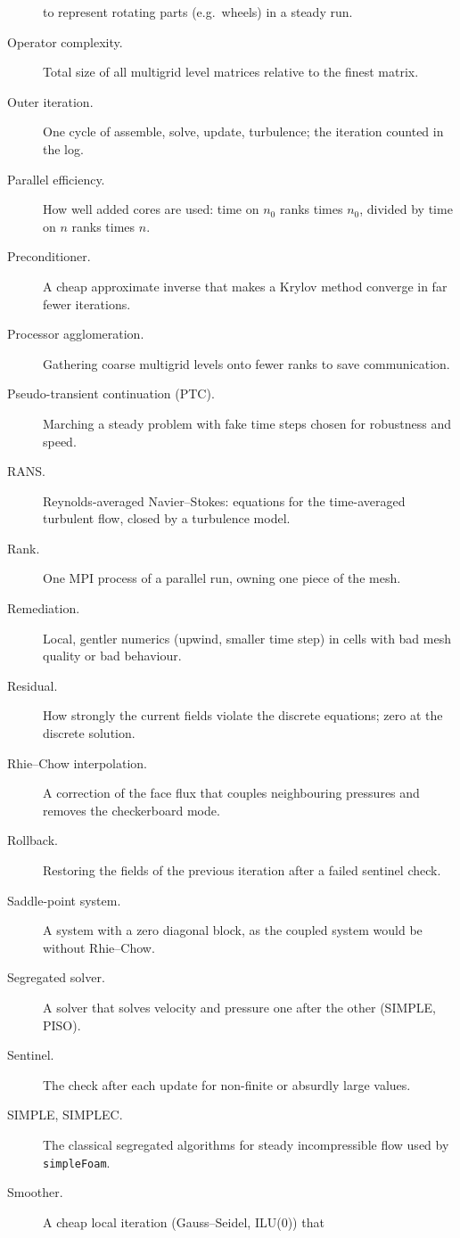 \documentclass[11pt,a4paper]{article}
\newcommand{\code}[1]{\texttt{#1}}
\begin{document}
\begin{description}
  to represent rotating parts (e.g.\ wheels) in a steady run.
\item[Operator complexity.] Total size of all multigrid level matrices
  relative to the finest matrix.
\item[Outer iteration.] One cycle of assemble, solve, update, turbulence;
  the iteration counted in the log.
\item[Parallel efficiency.] How well added cores are used: time on $n_0$
  ranks times $n_0$, divided by time on $n$ ranks times $n$.
\item[Preconditioner.] A cheap approximate inverse that makes a Krylov
  method converge in far fewer iterations.
\item[Processor agglomeration.] Gathering coarse multigrid levels onto fewer
  ranks to save communication.
\item[Pseudo-transient continuation (PTC).] Marching a steady problem with
  fake time steps chosen for robustness and speed.
\item[RANS.] Reynolds-averaged Navier--Stokes: equations for the
  time-averaged turbulent flow, closed by a turbulence model.
\item[Rank.] One MPI process of a parallel run, owning one piece of the
  mesh.
\item[Remediation.] Local, gentler numerics (upwind, smaller time step) in
  cells with bad mesh quality or bad behaviour.
\item[Residual.] How strongly the current fields violate the discrete
  equations; zero at the discrete solution.
\item[Rhie--Chow interpolation.] A correction of the face flux that couples
  neighbouring pressures and removes the checkerboard mode.
\item[Rollback.] Restoring the fields of the previous iteration after a
  failed sentinel check.
\item[Saddle-point system.] A system with a zero diagonal block, as the
  coupled system would be without Rhie--Chow.
\item[Segregated solver.] A solver that solves velocity and pressure one
  after the other (SIMPLE, PISO).
\item[Sentinel.] The check after each update for non-finite or absurdly
  large values.
\item[SIMPLE, SIMPLEC.] The classical segregated algorithms for steady
  incompressible flow used by \code{simpleFoam}.
\item[Smoother.] A cheap local iteration (Gauss--Seidel, ILU(0)) that

\end{description}
\end{document}
